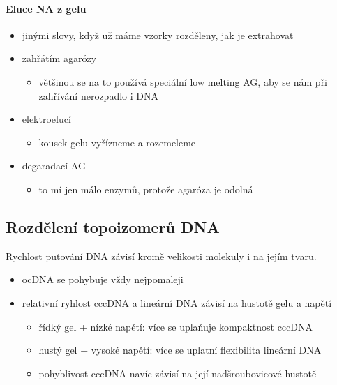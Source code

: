 \documentclass[DIV=8]{scrreprt}
\begin{document}
\paragraph{Eluce NA z gelu}
\begin{itemize}[nosep]
    \item jinými slovy, když už máme vzorky rozděleny, jak je extrahovat
    \item zahřátím agarózy
\begin{itemize}[nosep]
    \item většinou se na to používá speciální low melting AG, aby se nám při zahřívání nerozpadlo i DNA
\end{itemize}

    \item elektroelucí
\begin{itemize}[nosep]
    \item kousek gelu vyřízneme a rozemeleme
\end{itemize}

    \item degaradací AG
\begin{itemize}[nosep]
    \item to mí jen málo enzymů, protože agaróza je odolná
\end{itemize}

\end{itemize}



\subsection{Rozdělení topoizomerů DNA} \label{Rozdělení topoizomerů DNA}


Rychlost putování DNA závisí kromě velikosti molekuly i na jejím tvaru.

\begin{itemize}[nosep]
    \item ocDNA se pohybuje vždy nejpomaleji
    \item relativní ryhlost cccDNA a lineární DNA závisí na hustotě gelu a napětí
\begin{itemize}[nosep]
    \item řídký gel + nízké napětí: více se uplaňuje kompaktnost cccDNA
    \item hustý gel + vysoké napětí: více se uplatní flexibilita lineární DNA
    \item pohyblivost cccDNA navíc závisí na její nadšroubovicové hustotě
\end{itemize}

\end{itemize}
\end{document}
